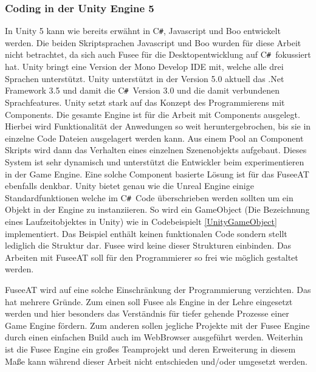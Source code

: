 \documentclass[pagesize, paper=a4, fontsize=12pt, titlepage=true, headings=small, headnosepline, abstractoff, liststotoc, nochapterprefix, plainheadsepline, twoside]{scrreprt}
\newcommand{\CS}{C\texttt{\#}}
\newcommand{\CSS}{C\texttt{\# }}
\begin{document}
\subsubsection{Coding in der Unity Engine 5}
In Unity 5 kann wie bereits erwähnt in \CS, Javascript und Boo entwickelt werden. Die beiden Skriptsprachen Javascript und Boo wurden für diese Arbeit nicht betrachtet, da sich auch Fusee für die Desktopentwicklung auf \CSS fokussiert hat. Unity bringt eine Version der Mono Develop IDE mit, welche alle drei Sprachen unterstützt. Unity unterstützt in der Version 5.0 aktuell das .Net Framework 3.5 und damit die \CSS Version 3.0 und die damit verbundenen Sprachfeatures. Unity setzt stark auf das Konzept des Programmierens mit Components. Die gesamte Engine ist für die Arbeit mit Components ausgelegt. Hierbei wird Funktionalität der Anwedungen so weit heruntergebrochen, bis sie in einzelne Code Dateien ausgelagert werden kann. Aus einem Pool an Component Skripts wird dann das Verhalten eines einzelnen Szenenobjekts aufgebaut. Dieses System ist sehr dynamisch und unterstützt die Entwickler beim experimentieren in der Game Engine. Eine solche Component basierte Lösung ist für das FuseeAT ebenfalls denkbar. Unity bietet genau wie die Unreal Engine einige Standardfunktionen welche im \CSS Code überschrieben werden sollten um ein Objekt in der Engine zu instanziieren. So wird ein GameObject (Die Bezeichnung eines Laufzeitobjektes in Unity) wie in Codebeispielt \ref{UnityGameObject} implementiert. Das Beispiel enthält keinen funktionalen Code sondern stellt lediglich die Struktur dar. Fusee wird keine dieser Strukturen einbinden. Das Arbeiten mit FuseeAT soll für den Programmierer so frei wie möglich gestaltet werden.



FuseeAT wird auf eine solche Einschränkung der Programmierung verzichten. Das hat mehrere Gründe. Zum einen soll Fusee als Engine in der Lehre eingesetzt werden und hier besonders das Verständnis für tiefer gehende Prozesse einer Game Engine fördern. Zum anderen sollen jegliche Projekte mit der Fusee Engine durch einen einfachen Build auch im WebBrowser ausgeführt werden. Weiterhin ist die Fusee Engine ein großes Teamprojekt und deren Erweiterung in diesem Maße kann während dieser Arbeit nicht entschieden und/oder umgesetzt werden.
\end{document}
